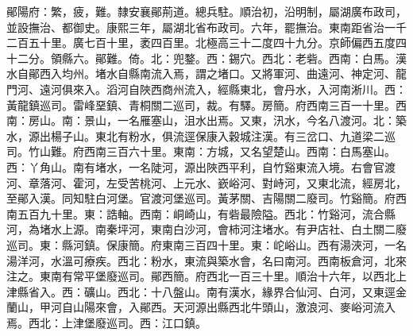 \begin{pinyinscope}
鄖陽府：繁，疲，難。隸安襄鄖荊道。總兵駐。順治初，沿明制，屬湖廣布政司，並設撫治、都御史。康熙三年，屬湖北省布政司。六年，罷撫治。東南距省治一千二百五十里。廣七百十里，袤四百里。北極高三十二度四十九分。京師偏西五度四十二分。領縣六。鄖難。倚。北：兜鍪。西：錫穴。西北：老砦。西南：白馬。漢水自鄖西入均州。堵水自縣南流入焉，謂之堵口。又將軍河、曲遠河、神定河、龍門河、遠河俱來入。滔河自陜西商州流入，經縣東北，會丹水，入河南淅川。西：黃龍鎮巡司。雷峰堊鎮、青桐關二巡司，裁。有驛。房簡。府西南三百一十里。西南：房山。南：景山，一名雁塞山，沮水出焉。又東，汛水，今名八渡河。北：築水，源出楊子山。東北有粉水，俱流逕保康入穀城注漢。有三岔口、九道梁二巡司。竹山難。府西南三百六十里。東南：方城，又名望楚山。西南：白馬塞山。西：丫角山。南有堵水，一名陡河，源出陜西平利，自竹谿東流入境。右會官渡河、章落河、霍河，左受苦桃河、上元水、嶔峪河、對峙河，又東北流，經房北，至鄖入漢。同知駐白河堡。官渡河堡巡司。黃茅關、吉陽關二廢司。竹谿簡。府西南五百九十里。東：誥軸。西南：峒崎山，有砦最險隘。西北：竹谿河，流合縣河，為堵水上源。南秦坪河，東南白沙河，會柿河注堵水。有尹店社、白土關二廢巡司。東：縣河鎮。保康簡。府東南三百四十里。東：岮峪山。西有湯浹河，一名湯洋河，水溫可療疾。西北：粉水，東流與築水會，名曰南河。西南板倉河，北來注之。東南有常平堡廢巡司。鄖西簡。府西北一百三十里。順治十六年，以西北上津縣省入。西：礦山。西北：十八盤山。南有漢水，緣界合仙河、白河，又東逕金蘭山，甲河自山陽來會，入鄖西。天河源出縣西北牛頭山，激浪河、麥峪河流入焉。西北：上津堡廢巡司。西：江口鎮。


\end{pinyinscope}

